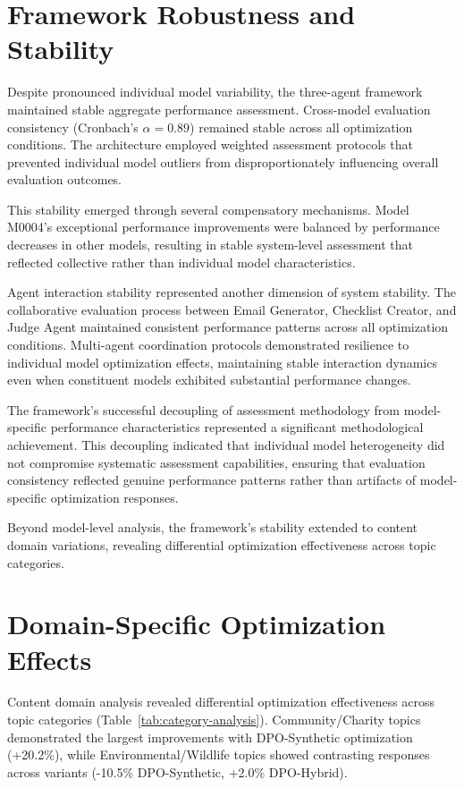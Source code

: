 \section{Framework Robustness and Stability}
\label{sec:framework-robustness}

Despite pronounced individual model variability, the three-agent framework maintained stable aggregate performance assessment. Cross-model evaluation consistency (Cronbach's $\alpha = 0.89$) remained stable across all optimization conditions. The architecture employed weighted assessment protocols that prevented individual model outliers from disproportionately influencing overall evaluation outcomes.

This stability emerged through several compensatory mechanisms. Model M0004's exceptional performance improvements were balanced by performance decreases in other models, resulting in stable system-level assessment that reflected collective rather than individual model characteristics.

Agent interaction stability represented another dimension of system stability. The collaborative evaluation process between Email Generator, Checklist Creator, and Judge Agent maintained consistent performance patterns across all optimization conditions. Multi-agent coordination protocols demonstrated resilience to individual model optimization effects, maintaining stable interaction dynamics even when constituent models exhibited substantial performance changes.

The framework's successful decoupling of assessment methodology from model-specific performance characteristics represented a significant methodological achievement. This decoupling indicated that individual model heterogeneity did not compromise systematic assessment capabilities, ensuring that evaluation consistency reflected genuine performance patterns rather than artifacts of model-specific optimization responses.

Beyond model-level analysis, the framework's stability extended to content domain variations, revealing differential optimization effectiveness across topic categories.

\section{Domain-Specific Optimization Effects}
\label{sec:domain-effects}

Content domain analysis revealed differential optimization effectiveness across topic categories (Table~\ref{tab:category-analysis}). Community/Charity topics demonstrated the largest improvements with DPO-Synthetic optimization (+20.2\%), while Environmental/Wildlife topics showed contrasting responses across variants (-10.5\% DPO-Synthetic, +2.0\% DPO-Hybrid).

